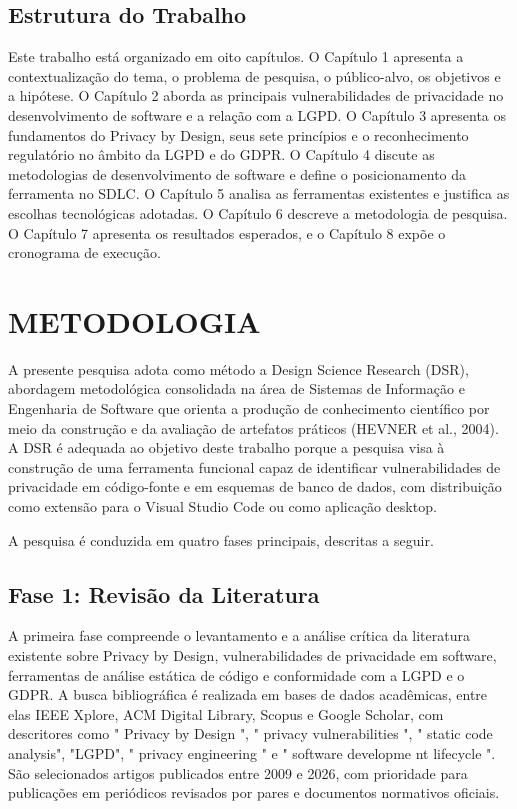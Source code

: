 \documentclass[oneside]{normas-utf-tex}
\begin{document}
\section{Estrutura do Trabalho}

Este trabalho está organizado em oito capítulos. O Capítulo 1 apresenta a contextualização do tema, o problema de pesquisa, o público-alvo, os objetivos e a hipótese. O Capítulo 2 aborda as principais vulnerabilidades de privacidade no desenvolvimento de software e a relação com a LGPD. O Capítulo 3 apresenta os fundamentos do Privacy by Design, seus sete princípios e o reconhecimento regulatório no âmbito da LGPD e do GDPR. O Capítulo 4 discute as metodologias de desenvolvimento de software e define o posicionamento da ferramenta no SDLC. O Capítulo 5 analisa as ferramentas existentes e justifica as escolhas tecnológicas adotadas. O Capítulo 6 descreve a metodologia de pesquisa. O Capítulo 7 apresenta os resultados esperados, e o Capítulo 8 expõe o cronograma de execução.

\chapter{METODOLOGIA}

A presente pesquisa adota como método a Design Science Research (DSR), abordagem metodológica consolidada na área de Sistemas de Informação e Engenharia de Software que orienta a produção de conhecimento científico por meio da construção e da avaliação de artefatos práticos (HEVNER et al., 2004). A DSR é adequada ao objetivo deste trabalho porque a pesquisa visa à construção de uma ferramenta funcional capaz de identificar vulnerabilidades de privacidade em código-fonte e em esquemas de banco de dados, com distribuição como extensão para o Visual Studio Code ou como aplicação desktop.

A pesquisa é conduzida em quatro fases principais, descritas a seguir.

\section{Fase 1: Revisão da Literatura}

A primeira fase compreende o levantamento e a análise crítica da literatura existente sobre Privacy by Design, vulnerabilidades de privacidade em software, ferramentas de análise estática de código e conformidade com a LGPD e o GDPR. A busca bibliográfica é realizada em bases de dados acadêmicas, entre elas IEEE Xplore, ACM Digital Library, Scopus e Google Scholar, com descritores como " Privacy by Design ", " privacy vulnerabilities ", " static code analysis", "LGPD", " privacy engineering " e " software developme nt lifecycle ". São selecionados artigos publicados entre 2009 e 2026, com prioridade para publicações em periódicos revisados por pares e documentos normativos oficiais.
\end{document}
